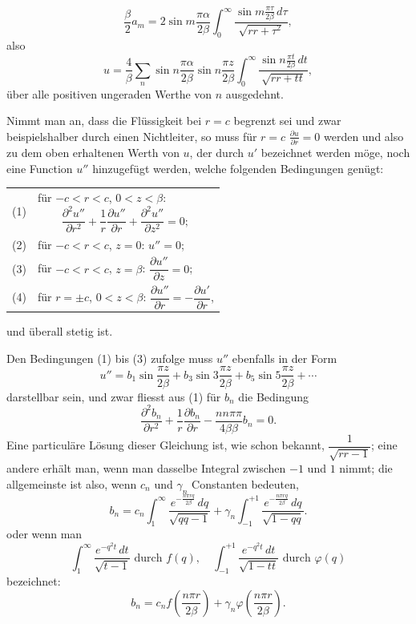 \documentclass[12pt,a4paper]{article}
\begin{document}
\[
\frac{\beta}{2} a_m = 2 \sin m\frac{\pi \alpha}{2\beta} \int_0^\infty \frac{\sin m\frac{\pi \tau}{2\beta}\, d\tau}{\sqrt{rr + \tau^2}},
\]
also
\[
u = \frac{4}{\beta} \sum_n \sin n\frac{\pi \alpha}{2\beta} \sin n\frac{\pi z}{2\beta} \int_0^\infty \frac{\sin n\frac{\pi t}{2\beta}\, dt}{\sqrt{rr + tt}},
\]
über alle positiven ungeraden Werthe von $n$ ausgedehnt.

Nimmt man an, dass die Flüssigkeit bei $r = c$ begrenzt sei und zwar beispielshalber durch einen Nichtleiter, so muss für $r = c$ $\frac{\partial u}{\partial r} = 0$ werden und also zu dem oben erhaltenen Werth von $u$, der durch $u'$ bezeichnet werden möge, noch eine Function $u''$ hinzugefügt werden, welche folgenden Bedingungen genügt:

\medskip
\begin{tabular}{@{}l@{\quad}p{}@{}}
(1) & für $-c < r < c$, $0 < z < \beta$:
\[\frac{\partial^2 u''}{\partial r^2} + \frac{1}{r}\frac{\partial u''}{\partial r} + \frac{\partial^2 u''}{\partial z^2} = 0;\] \\[0.5em]
(2) & für $-c < r < c$, $z = 0$: $u'' = 0$; \\[0.3em]
(3) & für $-c < r < c$, $z = \beta$: $\dfrac{\partial u''}{\partial z} = 0$; \\[0.5em]
(4) & für $r = \pm c$, $0 < z < \beta$: $\dfrac{\partial u''}{\partial r} = -\dfrac{\partial u'}{\partial r}$,
\end{tabular}
\medskip

\noindent und überall stetig ist.

Den Bedingungen (1) bis (3) zufolge muss $u''$ ebenfalls in der Form
\[
u'' = b_1 \sin \frac{\pi z}{2\beta} + b_3 \sin 3\frac{\pi z}{2\beta} + b_5 \sin 5\frac{\pi z}{2\beta} + \cdots
\]
darstellbar sein, und zwar fliesst aus (1) für $b_n$ die Bedingung
\[
\frac{\partial^2 b_n}{\partial r^2} + \frac{1}{r}\frac{\partial b_n}{\partial r} - \frac{nn\pi\pi}{4\beta\beta} b_n = 0.
\]
Eine particuläre Lösung dieser Gleichung ist, wie schon bekannt, $\dfrac{1}{\sqrt{rr - 1}}$; eine andere erhält man, wenn man dasselbe Integral zwischen $-1$ und $1$ nimmt; die allgemeinste ist also, wenn $c_n$ und $\gamma_n$ Constanten bedeuten,
\[
b_n = c_n \int_1^\infty \frac{e^{-\frac{n\pi r q}{2\beta}}\, dq}{\sqrt{qq - 1}} + \gamma_n \int_{-1}^{+1} \frac{e^{-\frac{n\pi r q}{2\beta}}\, dq}{\sqrt{1 - qq}}.
\]
oder wenn man
\[
\int_1^\infty \frac{e^{-q^2 t}\, dt}{\sqrt{t-1}} \text{ durch } f(q), \quad \int_{-1}^{+1} \frac{e^{-q^2 t}\, dt}{\sqrt{1-tt}} \text{ durch } \varphi(q)
\]
bezeichnet:
\[
b_n = c_n f\left(\frac{n\pi r}{2\beta}\right) + \gamma_n \varphi\left(\frac{n\pi r}{2\beta}\right).
\]
\end{document}
